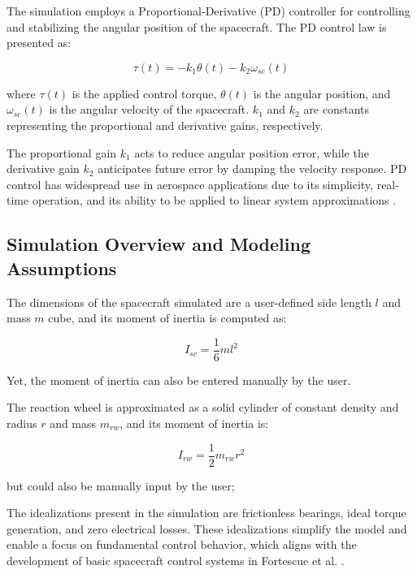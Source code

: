 \documentclass{ifacconf}
\begin{document}
The simulation employs a Proportional-Derivative (PD) controller for controlling and stabilizing the angular position of the spacecraft. The PD control law is presented as:

\begin{equation}
\tau(t) = -k_1 \theta(t) - k_2 \omega_{sc}(t)
\end{equation}

where $\tau(t)$ is the applied control torque, $\theta(t)$ is the angular position, and $\omega_{sc}(t)$ is the angular velocity of the spacecraft. $k_1$ and $k_2$ are constants representing the proportional and derivative gains, respectively.



The proportional gain $k_1$ acts to reduce angular position error, while the derivative gain $k_2$ anticipates future error by damping the velocity response. PD control has widespread use in aerospace applications due to its simplicity, real-time operation, and its ability to be applied to linear system approximations \cite{franklin2015feedback}.




\subsection{Simulation Overview and Modeling Assumptions}

The dimensions of the spacecraft simulated are a user-defined side length $l$ and mass $m$ cube, and its moment of inertia is computed as:

\begin{equation}
I_{sc} = \frac{1}{6}ml^2
\end{equation}

Yet, the moment of inertia can also be entered manually by the user.

The reaction wheel is approximated as a solid cylinder of constant density and radius $r$ and mass $m_{rw}$, and its moment of inertia is:

\begin{equation}
I_{rw} = \frac{1}{2}m_{rw}r^2 
\end{equation}

but could also be manually input by the user;

The idealizations present in the simulation are frictionless bearings, ideal torque generation, and zero electrical losses. These idealizations simplify the model and enable a focus on fundamental control behavior, which aligns with the development of basic spacecraft control systems in Fortescue et al. \citep{Fortescue2011}.
\end{document}
